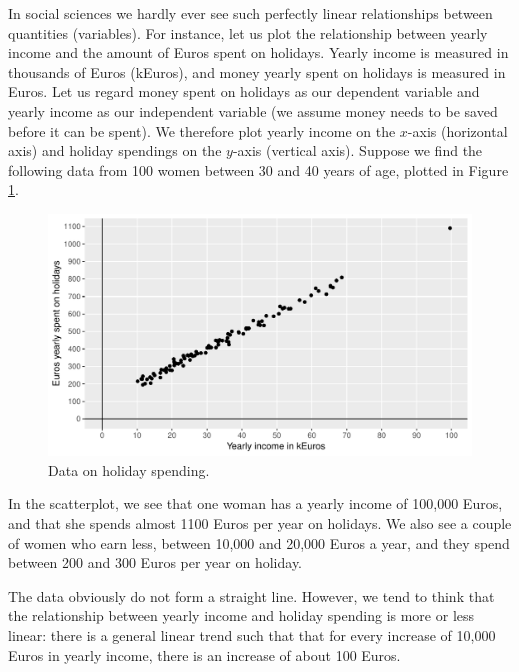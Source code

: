\documentclass[]{report}\usepackage[]{graphicx}\usepackage[]{color}
\makeatletter
\def\maxwidth{ %
  \ifdim\Gin@nat@width>\linewidth
    \linewidth
  \else
    \Gin@nat@width
  \fi
}
\newenvironment{knitrout}{}{} %
\makeatother
\begin{document}
In social sciences we hardly ever see such perfectly linear relationships between quantities (variables). For instance, let us plot the relationship between yearly income and the amount of Euros spent on holidays. Yearly income is measured in thousands of Euros (kEuros), and money yearly spent on holidays is measured in Euros. Let us regard money spent on holidays as our dependent variable and yearly income as our independent variable (we assume money needs to be saved before it can be spent). We therefore plot yearly income on the $x$-axis (horizontal axis) and holiday spendings on the $y$-axis (vertical axis). Suppose we find the following data from 100 women between 30 and 40 years of age, plotted in Figure \ref{fig:lm_8}.


\begin{knitrout}
\color{fgcolor}\begin{figure}

{\centering \includegraphics[width=\maxwidth]{figure/lm_8-1} 

}

\caption[Data on holiday spending]{Data on holiday spending.}\label{fig:lm_8}
\end{figure}


\end{knitrout}

In the scatterplot, we see that one woman has a yearly income of 100,000 Euros, and that she spends almost 1100 Euros per year on holidays. We also see a couple of women who earn less, between 10,000 and 20,000 Euros a year, and they spend between 200 and 300 Euros per year on holiday.

The data obviously do not form a straight line. However, we tend to think that the relationship between yearly income and holiday spending is more or less linear: there is a general linear trend such that that for every increase of 10,000 Euros in yearly income, there is an increase of about 100 Euros.
\end{document}
